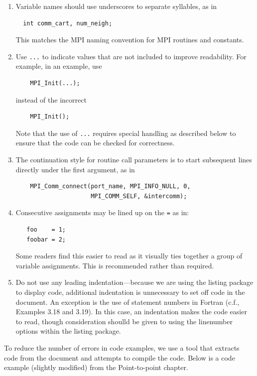 \documentclass[letterpaper,twoside,11pt,fleqn]{article}
\def\MPI/{\textsf{MPI}}    %
\begin{document}
\begin{enumerate}
\item Variable names should use underscores to separate syllables, as in
\begin{verbatim}
  int comm_cart, num_neigh;
\end{verbatim}
This matches the \MPI/ naming convention for \MPI/ routines and
constants.
\item Use \verb+...+ to indicate values that are not included to
  improve readability.  For example, in an example, use
\begin{verbatim}
    MPI_Init(...);
\end{verbatim}
instead of the incorrect
\begin{verbatim}
    MPI_Init();
\end{verbatim}
Note that the use of \verb+...+ requires special handling as described
below to ensure that the code can be checked for correctness.
\item The continuation style for routine call parameters is to start
subsequent lines directly under the first argument, as in
\begin{verbatim}
    MPI_Comm_connect(port_name, MPI_INFO_NULL, 0,
                     MPI_COMM_SELF, &intercomm);
\end{verbatim}
\item Consecutive assignments may be lined up on the \texttt{=} as
  in:
\begin{verbatim}
   foo    = 1;
   foobar = 2;
\end{verbatim}
Some readers find this easier to read as it visually ties together a
group of variable assignments.  This is recommended rather than required.

\item Do not use any leading indentation---because we are using the
  listing package to display code, additional indentation is
  unnecessary to set off code in the document.
An exception is the use of statement numbers in Fortran (c.f., Examples
3.18 and 3.19). In this case, an indentation makes the code easier to read,
though consideration shoulld be given to using the linenumber options
within the listing package.
\end{enumerate}

To reduce the number of errors in code examples, we use a tool that
extracts code from the document and attempts to compile the code.
Below is a code example (slightly modified) from the Point-to-point chapter.
\end{document}

